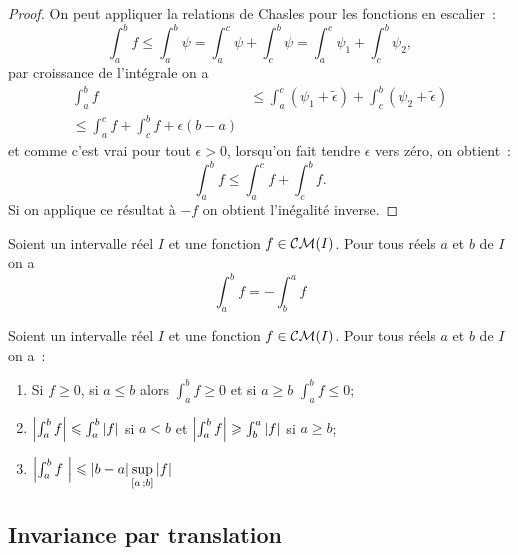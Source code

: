 \begin{proof}
  On peut appliquer la relations de Chasles pour les fonctions en escalier~:
  \begin{equation}
    \int_a^b f \leqslant \int_a^b \psi = \int_a^c \psi + \int_c^b \psi= \int_a^c \psi_1 + \int_c^b \psi_2,
  \end{equation}
  par croissance de l'intégrale on a
  \begin{align}
    \int_a^b f & \leqslant \int_a^c (\psi_1 + \tilde{\epsilon})  + \int_c^b (\psi_2 + \tilde{\epsilon}) \\
    \leqslant \int_a^c f + \int_c^b f + \epsilon(b-a)
  \end{align}
  et comme c'est vrai pour tout $\epsilon >0$, lorsqu'on fait tendre $\epsilon$ vers zéro, on obtient~:
  \begin{equation}
    \int_a^b f \leqslant \int_a^c f + \int_c^b f.
  \end{equation}
  Si on applique ce résultat à $-f$ on obtient l'inégalité inverse.
\end{proof}

\begin{prop}
  Soient un intervalle réel $I$ et une fonction $f \in \mathcal{CM}(I)$. Pour tous réels $a$ et $b$ de $I$ on a
  \begin{equation}
    \int_a^b f = - \int_b^a f
  \end{equation}
\end{prop}

\begin{theo}
  Soient un intervalle réel $I$ et une fonction $f \in \mathcal{CM}(I)$. Pour tous réels $a$ et $b$ de $I$ on a~:
  \begin{enumerate}
  \item Si $f \geqslant 0$, si $a \leqslant b$ alors $\int_a^bf \geqslant 0$ et si $a \geqslant b$ $\int_a^b f \leqslant 0$;
  \item $\left\lvert\int_a^b f\right\rvert \leqslant \int_a^b \left\lvert f\right\rvert$ si $a<b$ et $\left\lvert\int_a^b f\right\rvert \geqslant \int_b^a \left\lvert f\right\rvert$ si $a \geqslant b$;
  \item $\left\lvert\int_a^b f~\right\rvert \leqslant \left\lvert b-a\right\rvert \sup\limits_{\left[ a \, ;  b \right]} \left\lvert f\right\rvert$
  \end{enumerate}
\end{theo}

\subsection{Invariance par translation}

